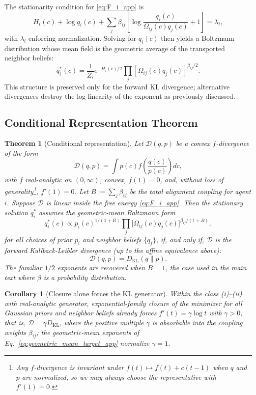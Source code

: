 \documentclass[11pt]{article}
\newtheorem{theorem}{Theorem}
\newtheorem{corollary}{Corollary}
\begin{document}
The stationarity condition for \eqref{eq:F_i_app} is
\begin{equation}
H_i(c)
+ \log q_i(c)
+ \sum_j \beta_{ij}
\left[
\log\frac{q_i(c)}{\Omega_{ij}(c)q_j(c)}+1
\right]
= \lambda_i,
\end{equation}
with $\lambda_i$ enforcing normalization. Solving for $q_i(c)$ then yields a Boltzmann distribution whose mean field is the geometric average of the transported neighbor beliefs:
\begin{equation}
q_i^*(c)
= \frac{1}{Z_i}
e^{-H_i(c)/2}
\prod_j
[\Omega_{ij}(c) q_j(c)]^{\beta_{ij}/2}.
\end{equation}
This structure is preserved only for the forward KL divergence; alternative divergences destroy the log-linearity of the exponent as previously discussed.

\subsection*{Conditional Representation Theorem}

\begin{theorem}[Conditional representation]\label{thm:representation_app}
Let\/ $\mathcal{D}(q,p)$ be a convex $f$-divergence of the form
\[
\mathcal{D}(q,p)
= \int p(c)f\left(\frac{q(c)}{p(c)}\right)dc,
\]
with $f$ \emph{real-analytic on $(0, \infty)$}, convex, $f(1)=0$, and, without loss of generality\footnote{Any $f$-divergence is invariant under $f(t)\mapsto f(t)+c(t-1)$ when $q$ and $p$ are normalized, so we may always choose the representative with $f'(1)=0$.}, $f'(1)=0$. Let $B := \sum_j \beta_{ij}$ be the total alignment coupling for agent $i$. Suppose $\mathcal{D}$ is linear inside the free energy \eqref{eq:F_i_app}. Then the stationary solution $q_i^*$ assumes the geometric-mean Boltzmann form
\begin{equation}
q_i^*(c) \propto p_i(c)^{1/(1+B)}\prod_{j}\bigl[\Omega_{ij}(c)q_j(c)\bigr]^{\beta_{ij}/(1+B)},
\label{eq:geometric_mean_target_app}
\end{equation}
for all choices of prior $p_i$ and neighbor beliefs $\{q_j\}$, if, and only if, $\mathcal{D}$ is the forward Kullback-Leibler divergence (up to the affine equivalence above):
\[
\mathcal{D}(q,p) = D_{\mathrm{KL}}(q\|p).
\]
The familiar $1/2$ exponents are recovered when $B = 1$, the case used in the main text where $\beta$ is a probability distribution.
\end{theorem}

\begin{corollary}[Closure alone forces the KL generator]
\label{cor:closure_forces_kl}
Within the class (i)--(ii) with real-analytic generator, exponential-family closure of the minimizer for all Gaussian priors and neighbor beliefs already forces $f'(t) = \gamma \log t$ with $\gamma > 0$, that is, $\mathcal{D} = \gamma D_{\mathrm{KL}}$, where the positive multiple $\gamma$ is absorbable into the coupling weights $\beta_{ij}$; the geometric-mean exponents of Eq.~\eqref{eq:geometric_mean_target_app} normalize $\gamma = 1$.
\end{corollary}
\end{document}
